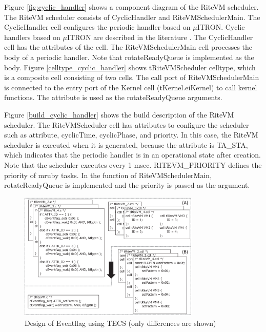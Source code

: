 \documentclass{sig-alternate-05-2015}
\begin{document}
Figure \ref{fig:cyclic_handler} shows a component diagram of the RiteVM scheduler.
The RiteVM scheduler consists of CyclicHandler and RiteVMSchedulerMain.
The CyclicHandler {\myit cell} configures the periodic handler based on $\mu$ITRON.
Cyclic handlers based on $\mu$ITRON are described in the literature \cite{par:microITRON}.
The CyclicHandler {\myit cell} has the attributes of the {\myit cell}.
The RiteVMSchedulerMain {\myit cell} processes the body of a periodic handler.
Note that {\myit rotateReadyQueue} is implemented as the body.
Figure \ref{celltype_cyclic_handler} shows tRiteVMScheduler {\myit celltype}, which is a {\myit composite cell} consisting of two {\myit cell}s.
The {\myit call} port of RiteVMSchedulerMain is connected to the {\myit entry} port of the Kernel {\myit cell} ({\myit tKernel.eiKernel}) to call kernel functions.
The attribute is used as the {\myit rotateReadyQueue} arguments.

Figure \ref{build_cyclic_handler} shows the build description of the RiteVM scheduler.
The RiteVMScheduler {\myit cell} has attributes to configure the scheduler such as attribute, cyclicTime, cyclicPhase, and priority.
In this case, the RiteVM scheduler is executed when it is generated, because the attribute is {\myit TA\_STA}, which indicates that the periodic handler is in an operational state after creation.
Note that the scheduler executes every 1 msec.
RITEVM\_PRIORITY defines the priority of mruby tasks.
In the function of RiteVMSchedulerMain, {\myit rotateReadyQueue} is implemented and the priority is passed as the argument.


\begin{figure}[t]
    \centering
    \includegraphics[width=8.6cm,clip]{figure/Eventflag.eps}
    \vspace{0.5mm}
\caption{Design of Eventflag using TECS (only differences are shown)}
    \vspace{1mm}
\label{fig:Eventflag}
\end{figure}
\end{document}
